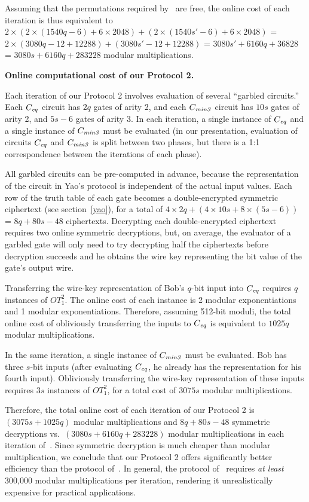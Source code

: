 Assuming that the permutations required by~\cite{atallah} are free,
the online cost of each iteration is thus equivalent to
$2 \times (2 \times (1540 q - 6) + 6 \times 2048) +
          (2 \times (1540 s' - 6) + 6 \times 2048)$ =
$2 \times (3080 q - 12 + 12288) +
          (3080 s' - 12 + 12288)$ =
$3080s' + 6160q + 36828$ =
$3080s + 6160q + 283228$ modular multiplications.

\vspace{1ex}
\noindent
\textbf{Online computational cost of our Protocol 2.}

Each iteration of our Protocol 2 involves evaluation of several ``garbled
circuits.''  Each $C_{\mathit{eq}}$ circuit has $2q$ gates of arity 2, and each
$C_{\mathit{min3}}$ circuit has $10s$ gates of arity 2, and $5s-6$ gates of arity 3.
In each iteration, a single instance of $C_{\mathit{eq}}$ and a single instance of
$C_{\mathit{min3}}$ must be evaluated (in our presentation, evaluation of circuits $C_{\mathit{eq}}$
and $C_{\mathit{min3}}$ is split between two phases, but there is a 1:1 correspondence
between the iterations of each phase).

All garbled circuits can be pre-computed in advance, because the
representation of the circuit in Yao's protocol is independent of the
actual input values.  Each row of the truth table of each gate becomes
a double-encrypted symmetric ciphertext (see section~\ref{yao}), for
a total of $4 \times 2 q + (4 \times 10s +  8 \times (5s - 6))$ = $8q
+ 80s - 48$ ciphertexts.  Decrypting each double-encrypted ciphertext
requires two online symmetric decryptions, but, on average, the evaluator
of a garbled gate will only need to try decrypting half the ciphertexts
before decryption succeeds and he obtains the wire key representing the
bit value of the gate's output wire.

Transferring the wire-key representation of Bob's $q$-bit input into $C_{\mathit{eq}}$
requires $q$ instances of $OT_1^2$.  The online cost of each instance
is 2 modular exponentiations and 1 modular exponentiations.  Therefore,
assuming 512-bit moduli, the total online cost of obliviously transferring
the inputs to $C_{\mathit{eq}}$ is equivalent to $1025q$ modular multiplications.

In the same iteration, a single instance of $C_{\mathit{min3}}$ must be evaluated.
Bob has three $s$-bit inputs (after evaluating $C_{\mathit{eq}}$, he already has
the representation for his fourth input).  Obliviously transferring
the wire-key representation of these inputs requires $3s$ instances of
$OT_1^2$, for a total cost of $3075 s$ modular multiplications.

Therefore, the total online cost of each iteration of our Protocol
2 is $(3075 s + 1025 q)$ modular multiplications and $8q + 80s -
48$ symmetric decryptions vs.\ $(3080 s + 6160 q + 283228)$ modular
multiplications in each iteration of~\cite{atallah}.  Since symmetric
decryption is much cheaper than modular multiplication, we conclude
that our Protocol 2 offers significantly better efficiency than the
protocol of~\cite{atallah}.  In general, the protocol of~\cite{atallah}
requires \emph{at least} 300,000 modular multiplications per iteration,
rendering it unrealistically expensive for practical applications.

